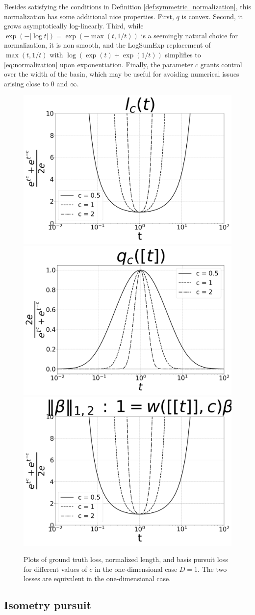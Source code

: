 Besides satisfying the conditions in Definition \ref{def:symmetric_normalization}, this normalization has some additional nice properties.
First, $q$ is convex.
Second, it grows asymptotically log-linearly.
Third, while $\exp(-|\log t|) = \exp(-\max (t, 1/t))$ is a seemingly natural choice for normalization, it is non smooth, and the LogSumExp \citep{Boyd2004-ql} replacement of $\max (t, 1/t)$ with $ \log (\exp (t ) + \exp(1/t))$ simplifies to \ref{eq:normalization} upon exponentiation.
Finally, the parameter $c$ grants control over the width of the basin, which may be useful for avoiding numerical issues arising close to $0$ and $\infty$.

\begin{figure}
\centering
{}
{\includegraphics[width = .32\textwidth]{../figures/Figure_1a_bw.png}}
\label{fig:gt_loss}
{\includegraphics[width = .32\textwidth]{../figures/Figure_1b_bw.png}}
{\includegraphics[width = .32\textwidth]{../figures/Figure_1c_bw.png}}
\caption{Plots of ground truth loss, normalized length, and basis pursuit loss for different values of $c$ in the one-dimensional case $D = 1$.
The two losses are equivalent in the one-dimensional case.}
\label{fig:losses}
\end{figure}

\subsection{Isometry pursuit}

